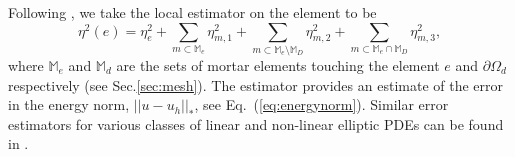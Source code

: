 %
Following \cite{bi2015posteriori}, we take the local estimator on the element to be
%
\begin{equation}
\label{eq:Eta2_Local}
\eta^2(e) =\eta^{2}_{e} + \sum_{m \subset \mathbb{M}_e}\eta^{2}_{m,1} + \sum_{m \subset \mathbb{M}_e\setminus \mathbb{M}_D}\eta^{2}_{m,2} + \sum_{m \subset \mathbb{M}_e \cap \mathbb{M}_D}\eta^{2}_{m,3},
\end{equation}
%
where $\mathbb{M}_e$ and $\mathbb{M}_d$ are the sets of mortar elements touching the element $e$ and  $\partial \Omega_d$ respectively (see Sec.\ref{sec:mesh}). %
The estimator provides an estimate of the error in the energy norm, $ || u - u_h ||_* $, see Eq.~(\ref{eq:energynorm}).  Similar error estimators for various classes of linear and non-linear elliptic PDEs can be found in \cite{houstonschotzau05,hansbo2011energy,zhu2011energy,houston2007energy,schotzau.d;zhu.l2009,houstonperugia05,lovadina.c;marini.l2009}.
